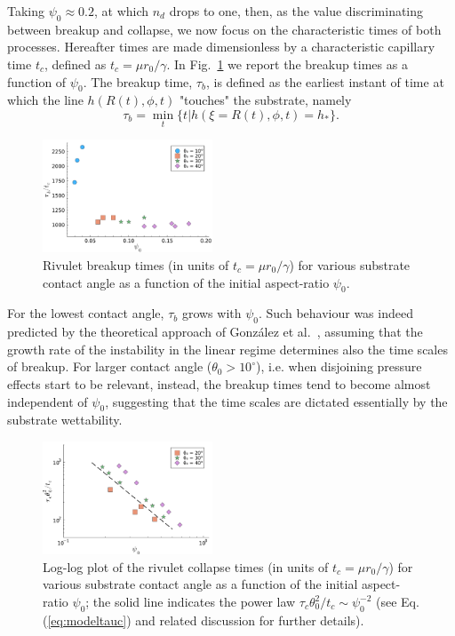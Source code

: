 \documentclass[twoside,twocolumn,9pt]{article}
\begin{document}
Taking $\psi_0 \approx 0.2$, at which $n_d$ drops to one, then, as the value discriminating between breakup and collapse, we now focus on the characteristic times of both processes.
Hereafter times are made dimensionless by a characteristic capillary time $t_c$, defined as $t_c = \mu r_0/\gamma$.
In Fig.~\ref{fig:breakuptimes} we report the breakup times as a function of $\psi_0$.
The breakup time, $\tau_b$, is defined as the earliest instant of time at which the line $h(R(t),\phi,t)$ "touches" the substrate, namely
\begin{equation}\label{eq:breakuptime}
\tau_b = \min_t \{t | h(\xi=R(t),\phi,t) = h_{\ast}\}.
\end{equation}
\begin{figure}
    \centering
    \includegraphics[width = 0.45\textwidth]{Figure_3.pdf}
    \caption{Rivulet breakup times (in units of $t_c = \mu r_0/\gamma$) for various substrate contact angle as a function of the initial aspect-ratio $\psi_0$.}
    \label{fig:breakuptimes}
\end{figure}
For the lowest contact angle, $\tau_b$ grows with $\psi_0$. 
Such behaviour was indeed predicted by the theoretical approach of Gonz\'alez et al.~\cite{gonzalezStabilityLiquidRing2013}, assuming that the growth rate of the instability in the linear regime determines also the time scales of breakup. 
For larger contact angle ($\theta_0 > 10^{\circ}$), i.e. when disjoining pressure effects start to be relevant, instead, the breakup times tend to become almost independent of $\psi_0$, suggesting that the time scales are dictated essentially by the substrate wettability.\\
\begin{figure}
    \centering
    \includegraphics[width = 0.45\textwidth]{Figure_4.pdf}
    \caption{Log-log plot of the rivulet collapse times (in units of $t_c = \mu r_0/\gamma$) for various substrate contact angle as a function of the initial aspect-ratio $\psi_0$; the solid line indicates the power law $\tau_c \theta_0^2/t_c \sim \psi_0^{-2}$ (see Eq.(\ref{eq:modeltauc}) and related discussion for further details).}
    \label{fig:collapsetimes}
\end{figure}
\end{document}
